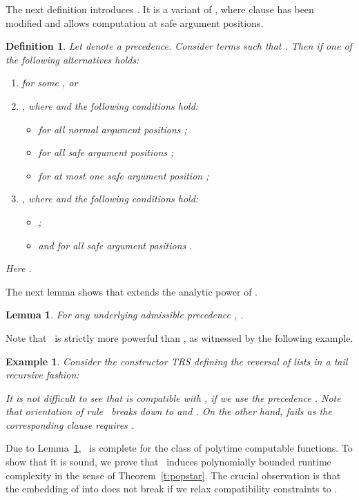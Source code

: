 \documentclass{LMCS}
\newtheorem{example}[thm]{Example}
\newtheorem{definition}[thm]{Definition}
\newtheorem{lemma}[thm]{Lemma}
\begin{document}
The next definition introduces .
It is a variant of , where 
clause  has been modified and allows computation at safe argument positions.
\begin{definition}\label{d:gpopps}
  Let  denote a precedence.  
  Consider terms  such that .
  Then  if one of the following alternatives holds:
  \begin{enumerate}[labelsep=*,leftmargin=*]
  \item\label{d:gpopps:st}  for some , or
  \item\label{d:gpopps:ia} ,  where  
    and the following conditions hold:
    \begin{itemize}
    \item  for all normal argument positions ;
    \item  for all safe argument positions ;
    \item  for at most one safe argument position ;
    \end{itemize}
  \item\label{d:gpopps:ep} ,  where 
    and the following conditions hold:
    \begin{itemize}
    \item ;
    \item  and  for all safe argument positions .
    \end{itemize}
  \end{enumerate}
  Here .
\end{definition}

The next lemma shows that  extends the analytic power of .
\begin{lemma}\label{l:psextends}
  For any underlying admissible precedence , .
\end{lemma}
Note that \POPSTARP~is strictly more powerful than \POPSTAR, as witnessed by 
the following example.

\begin{example}\label{ex:rsrev}
Consider the constructor TRS  defining the reversal of
lists in a tail recursive fashion:

It is not difficult to see that  is compatible with \POPSTARP,
if we use the precedence .
Note that orientation of rule~
breaks down to  and 
.
On the other hand,  fails as the corresponding clause  
requires .
\end{example}

Due to Lemma~\ref{l:psextends}, \POPSTARP\ is complete for the class of
polytime computable functions.
To show that it is sound, we prove that 
\POPSTARP~induces polynomially bounded runtime complexity in the sense of Theorem~\ref{t:popstar}.
The crucial observation is that the embedding of  into  does not break
if we relax compatibility constraints to .
\end{document}
